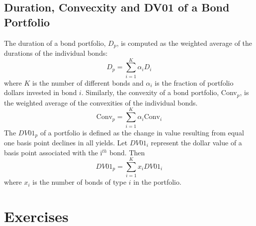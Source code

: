 \subsection{Duration, Convecxity and DV01 of a Bond Portfolio}
The duration of a bond portfolio, $D_p$, is computed as the weighted average of the durations of the individual
bonds:
\begin{equation}
D_p = \sum_{i=1}^{K} \alpha_i D_i
\end{equation}
where $K$ is the number of different bonds and $\alpha_i$ is the fraction of portfolio dollars invested in bond $i$. Similarly, the convexity of a bond portfolio, Conv$_p$, is the weighted average of the convexities of the individual bonds.
\begin{equation}
\textrm{Conv}_p = \sum^{K}_{i=1} \alpha_i \textrm{Conv}_i
\end{equation}
The $DV01_p$ of a portfolio is defined as the change in value resulting from equal one basis point declines in all yields. Let $DV01_i$ represent the dollar value of a basis point associated with the i$^{th}$ bond. Then
\begin{equation}
DV01_p = \sum^{K}_{i=1}x_i DV01_i
\end{equation}
where $x_i$ is the number of bonds of type $i$ in the portfolio.

\section*{Exercises}

